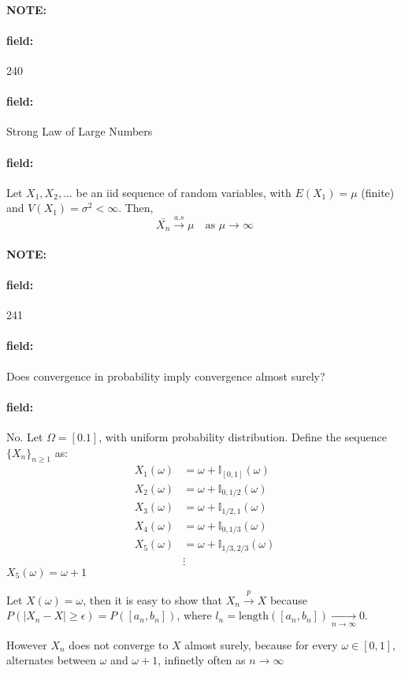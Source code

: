 \documentclass[12pt]{article}
\newenvironment{note}{\paragraph{NOTE:}}{}
\newenvironment{field}{\paragraph{field:}}{}
\begin{document}
\begin{note} \begin{field} \tiny 240 \end{field}
  \begin{field}
    Strong Law of Large Numbers
  \end{field}
  \begin{field}
    Let $X_1, X_2, \ldots$ be an iid sequence of random variables, with $E(X_1) = \mu$ (finite) and $V(X_1) = \sigma^2 < \infty$. Then,
    $$\bar{X_n} \overset{a.s}{\to} \mu \quad \text{as } \mu \to \infty$$
  \end{field}
\end{note}

\begin{note} \begin{field} \tiny 241 \end{field}
  \begin{field}
    Does convergence in probability imply convergence almost surely?
  \end{field}
  \begin{field}
    No.
    Let $\Omega = [0.1]$, with uniform probability distribution.  Define the sequence $\{X_n\}_{n \geq 1}$ as:
    \begin{align*}
      X_1(\omega) &= \omega + \mathbb{I}_{[0,1]}(\omega)\\
      X_2(\omega) &= \omega + \mathbb{I}_{0,1/2}(\omega)\\
      X_3(\omega) &= \omega + \mathbb{I}_{1/2,1}(\omega)\\
      X_4(\omega) &= \omega + \mathbb{I}_{0,1/3}(\omega)\\
      X_5(\omega) &= \omega + \mathbb{I}_{1/3,2/3}(\omega)\\
      &\vdots
    \end{align*}
    $X_5(\omega) = \omega + 1$

    Let $X(\omega) = \omega$, then it is easy to show that $X_n \overset{p}{\to} X$ because $P(|X_n - X| \geq \epsilon) = P([a_n,b_n])$, where $l_n = \text{length}([a_n, b_n]) \underset{n \to \infty}{\to} 0$.

    However $X_n$ does not converge to $X$ almost surely, because for every $\omega \in [0,1]$, alternates between $\omega$ and $\omega + 1$, infinetly often as $n \to \infty$
  \end{field}
\end{note}
\end{document}
